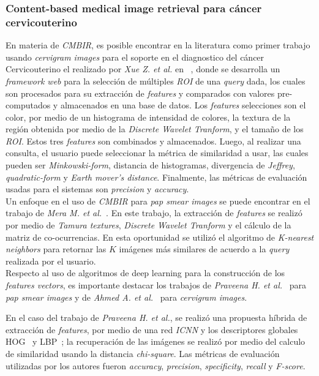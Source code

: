 \documentclass[10pt]{article}
\begin{document}
\subsubsection{Content-based medical image retrieval para cáncer cervicouterino}
En materia de \textit{CMBIR}, es posible encontrar en la literatura como primer trabajo usando \textit{cervigram images} para el soporte en el diagnostico del cáncer Cervicouterino el realizado por \textit{Xue Z. et al.} en ~\cite{10.1117/12.769440}, donde se desarrolla un \textit{framework web} para la selección de múltiples \textit{ROI} de una \textit{query} dada, los cuales son procesados para su extracción de \textit{features} y comparados con valores pre-computados y almacenados en una base de datos. Los \textit{features} selecciones son el color, por medio de un histograma de intensidad de colores, la textura de la región obtenida por medio de la \textit{Discrete Wavelet Tranform}, y el tamaño de los \textit{ROI}. Estos tres \textit{features} son combinados y almacenados. Luego, al realizar una consulta, el usuario puede seleccionar la métrica de similaridad a usar, las cuales pueden ser \textit{Minkowski-form}, distancia de histogramas, divergencia de \textit{Jeffrey}, \textit{quadratic-form} y \textit{Earth mover's distance}. Finalmente, las métricas de evaluación usadas para el sistemas son \textit{precision} y \textit{accuracy}.\\

Un enfoque en el uso de \textit{CMBIR} para \textit{pap smear images} se puede encontrar en el trabajo de \textit{Mera M. et al.}~\cite{10.1007/s12553-015-0114-2}. En este trabajo, la extracción de \textit{features} se realizó por medio de \textit{Tamura textures}, \textit{Discrete Wavelet Tranform} y el cálculo de la matriz de co-ocurrencias. En esta oportunidad se utilizó el algoritmo de \textit{K-nearest neighbors} para retornar las $K$ imágenes más similares de acuerdo a la \textit{query} realizada por el usuario.\\

Respecto al uso de algoritmos de deep learning para la construcción de los \textit{features vectors}, es importante destacar los trabajos de \textit{Praveena H. et al.}~\cite{Praveena2022} para \textit{pap smear images} y de \textit{Ahmed A. et al.}~\cite{Ahmed2022} para \textit{cervigram images}.

En el caso del trabajo de \textit{Praveena H. et al.}, se realizó una propuesta híbrida de extracción de \textit{features}, por medio de una red \textit{ICNN} y los descriptores globales HOG~\cite{Nigam2018} y LBP~\cite{priya2018facial}; la recuperación de las imágenes se realizó por medio del calculo de similaridad usando la distancia \textit{chi-square}. Las métricas de evaluación utilizadas por los autores fueron \textit{accuracy}, \textit{precision}, \textit{specificity}, \textit{recall} y \textit{F-score}.
\end{document}
